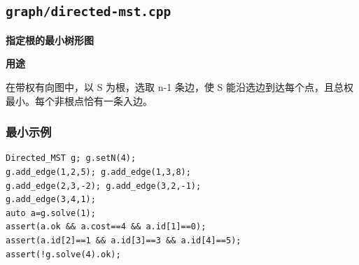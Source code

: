 \documentclass[UTF8,a4paper,10pt]{ctexart}
\newcommand{\TemplUsage}[1]{\textbf{用途}\par #1\par}
\begin{document}
\subsection{\texttt{graph/directed-mst.cpp}}
\textbf{指定根的最小树形图}\par
\TemplUsage{在带权有向图中，以 S 为根，选取 n-1 条边，使 S 能沿选边到达每个点，且总权最小。每个非根点恰有一条入边。}
\subsubsection*{最小示例}
\begin{lstlisting}
Directed_MST g; g.setN(4);
g.add_edge(1,2,5); g.add_edge(1,3,8);
g.add_edge(2,3,-2); g.add_edge(3,2,-1);
g.add_edge(3,4,1);
auto a=g.solve(1);
assert(a.ok && a.cost==4 && a.id[1]==0);
assert(a.id[2]==1 && a.id[3]==3 && a.id[4]==5);
assert(!g.solve(4).ok);
\end{lstlisting}
\end{document}
